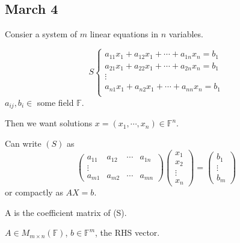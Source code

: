 \documentclass[12pt]{article}
\newcommand{\mF}{{\mathbb{F}}}
\begin{document}

\newpage
\subsection{March 4}
Consier a system of $m$ linear equations in $n$ variables. 

\[
	S 
	\begin{cases}
		a_{11} x_1 + a_{12} x_1 + \cdots + a_{1n}x_n = b_1\\
		a_{21} x_1 + a_{22} x_1 + \cdots + a_{2n}x_n = b_1\\
		\vdots	\\
		a_{n1} x_1 + a_{n2} x_1 + \cdots + a_{nn}x_n = b_1\\
	\end{cases}
\]
$a_{ij}, b_i \in$ some field $\mF$. 

Then we want solutions $x = (x_1, \cdots, x_n) \in \mF^n$. 

Can write $(S)$ as 
\[
	\begin{pmatrix}
		a_{11} & a_{12} & \cdots & a_{1n}	\\
		\vdots &	\\
		a_{m1} & a_{m2} & \cdots & a_{mn}
	\end{pmatrix}
	\begin{pmatrix}
		x_1	\\
		x_2	\\
		\vdots	\\
		x_n
	\end{pmatrix}
	=
	\begin{pmatrix}
		b_1	\\
		\vdots	\\
		b_m
	\end{pmatrix}
\]
or compactly as $AX = b$. 

A is the coefficient matrix of (S). 

$A \in M_{m\times n}(\mF)$, $b \in \mF^m$, the RHS vector.
\end{document}

